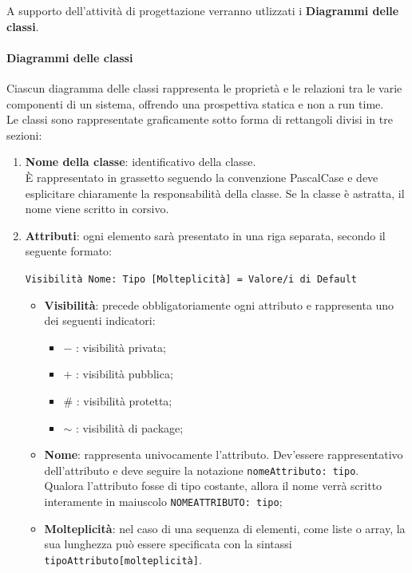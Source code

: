 A supporto dell'attività di progettazione verranno utlizzati i \textbf{Diagrammi delle classi}. \\

\paragraph*{Diagrammi delle classi}
Ciascun diagramma delle classi rappresenta le proprietà e le relazioni tra le varie componenti di un sistema, offrendo una prospettiva statica e non a run time. \\
Le classi sono rappresentate graficamente sotto forma di rettangoli divisi in tre sezioni:
\begin{enumerate}
    \item \textbf{Nome della classe}: identificativo della classe. \\
    È rappresentato in grassetto seguendo la convenzione PascalCase e deve esplicitare chiaramente la responsabilità della classe. Se la classe è astratta, il nome viene scritto in corsivo.
    \item \textbf{Attributi}: ogni elemento sarà presentato in una riga separata, secondo il seguente formato: \\
    \begin{center}\texttt{Visibilità Nome: Tipo [Molteplicità] = Valore/i di Default}\end{center}
    \begin{itemize}
        \item \textbf{Visibilità}: precede obbligatoriamente ogni attributo e rappresenta uno dei seguenti indicatori:
        \begin{itemize}
            \item $-$ : visibilità privata;
            \item $+$ : visibilità pubblica;
            \item $\#$ : visibilità protetta;
            \item $\sim$ : visibilità di package;
        \end{itemize}
        \item \textbf{Nome}: rappresenta univocamente l'attributo. Dev'essere rappresentativo dell'attributo e deve seguire la notazione \texttt{nomeAttributo: tipo}. \\
        Qualora l'attributo fosse di tipo costante, allora il nome verrà scritto interamente in maiuscolo \texttt{NOMEATTRIBUTO: tipo};
        \item \textbf{Molteplicità}: nel caso di una sequenza di elementi, come liste o array, la sua lunghezza può essere specificata con la sintassi \texttt{tipoAttributo[molteplicità]}. \\

\end{itemize}
\end{enumerate}
